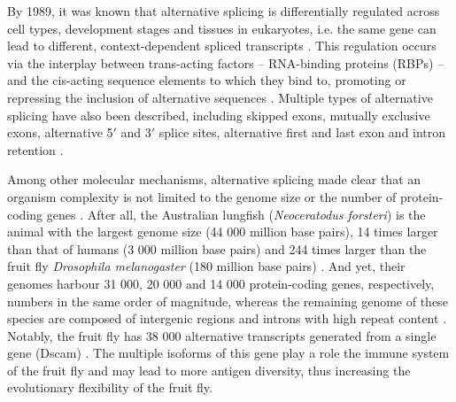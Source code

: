 By 1989, it was known that alternative splicing is differentially regulated across cell types, development stages and tissues in eukaryotes, i.e. the same gene can lead to different, context-dependent spliced transcripts \cite{smith:1989tr}. This regulation occurs via the interplay between trans-acting factors -- RNA-binding proteins (RBPs) -- and the cis-acting sequence elements to which they bind to, promoting or repressing the inclusion of alternative sequences \cite{smith:1989tr}. Multiple types of alternative splicing have also been described, including skipped exons, mutually exclusive exons, alternative 5$'$ and 3$'$ splice sites, alternative first and last exon and intron retention \cite{smith:1989tr}.



Among other molecular mechanisms, alternative splicing made clear that an organism complexity is not limited to the genome size or the number of protein-coding genes \cite{}. After all, the Australian lungfish (\emph{Neoceratodus forsteri}) is the animal with the largest genome size (44 000 million base pairs), 14 times larger than that of humans (3 000 million base pairs) and 244 times larger than the fruit fly \emph{Drosophila melanogaster} (180 million base pairs) \cite{meyer:2021vn,dmelanogaster}. And yet, their genomes harbour 31 000, 20 000 and 14 000 protein-coding genes, respectively, numbers in the same order of magnitude, whereas the remaining genome of these species are composed of intergenic regions and introns with high repeat content \cite{meyer:2021vn,dmelanogaster}. Notably, the fruit fly has 38 000 alternative transcripts generated from a single gene (Dscam) \cite{schmucker:2000wf}. The multiple isoforms of this gene play a role the immune system of the fruit fly and may lead to more antigen diversity, thus increasing the evolutionary flexibility of the fruit fly.




